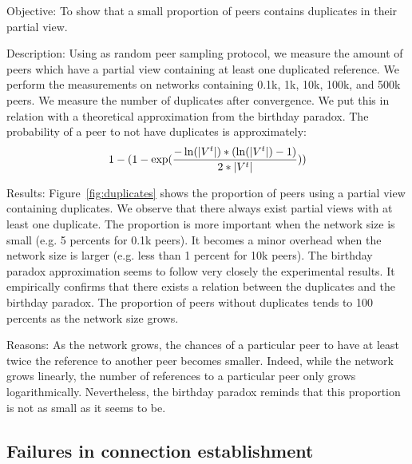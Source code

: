 \begin{asparadesc} 
\item[Objective:] To show that a small proportion of peers contains duplicates
  in their partial view.
\item[Description:] Using \SPRAY as random peer sampling protocol, we measure
  the amount of peers which have a partial view containing at least one
  duplicated reference. We perform the measurements on networks containing
  0.1k, 1k, 10k, 100k, and 500k peers. We measure the number of duplicates
  after convergence. We put this in relation with a theoretical approximation
  from the birthday paradox. The probability of a peer to not have duplicates
  is approximately:
  \begin{equation*}
    1- 
    (1-
    \exp({-\ln(|V^t|)*(\ln(|V^t|)-1)\over{2*|V^t|}}))
  \end{equation*}
\item[Results:] Figure~\ref{fig:duplicates} shows the proportion of peers using
  a partial view containing duplicates. We observe that there always exist
  partial views with at least one duplicate. The proportion is more important
  when the network size is small (e.g. 5 percents for 0.1k peers). It becomes a
  minor overhead when the network size is larger (e.g. less than 1 percent for
  10k peers). The birthday paradox approximation seems to follow very closely
  the experimental results. It empirically confirms that there exists a relation
  between the duplicates and the birthday paradox. The proportion of peers
  without duplicates tends to 100 percents as the network size grows.
\item[Reasons:] As the network grows, the chances of a particular peer to have
  at least twice the reference to another peer becomes smaller. Indeed, while
  the network grows linearly, the number of references to a particular peer
  only grows logarithmically. Nevertheless, the birthday paradox reminds that
  this proportion is not as small as it seems to be.
\end{asparadesc}


\subsection{Failures in connection establishment}
\label{subsec:degeneration}

